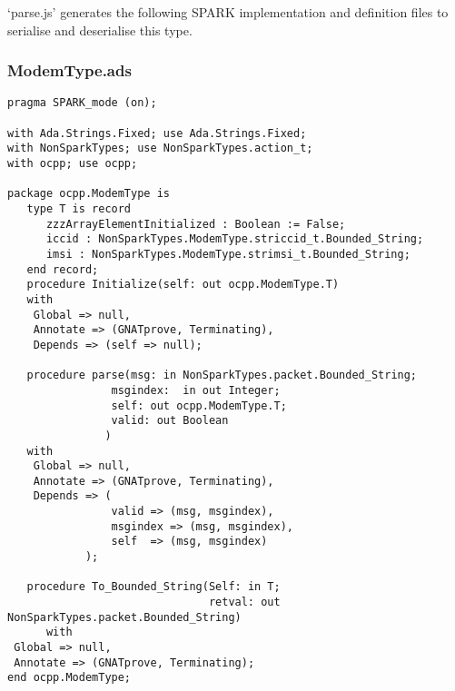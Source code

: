 \documentclass[12pt,openany,a4paper]{book}
\begin{document}
`parse.js' generates the following SPARK implementation and definition files to serialise and deserialise this type.

\subsubsection{ModemType.ads}
\begin{verbatim}
pragma SPARK_mode (on); 

with Ada.Strings.Fixed; use Ada.Strings.Fixed;
with NonSparkTypes; use NonSparkTypes.action_t; 
with ocpp; use ocpp;

package ocpp.ModemType is
   type T is record
      zzzArrayElementInitialized : Boolean := False;
      iccid : NonSparkTypes.ModemType.striccid_t.Bounded_String;
      imsi : NonSparkTypes.ModemType.strimsi_t.Bounded_String;
   end record;
   procedure Initialize(self: out ocpp.ModemType.T)
   with
    Global => null,
    Annotate => (GNATprove, Terminating),
    Depends => (self => null);

   procedure parse(msg: in NonSparkTypes.packet.Bounded_String;
                msgindex:  in out Integer;
                self: out ocpp.ModemType.T;
                valid: out Boolean
               )
   with
    Global => null,
    Annotate => (GNATprove, Terminating),
    Depends => (
                valid => (msg, msgindex),
                msgindex => (msg, msgindex),
                self  => (msg, msgindex)
            );

   procedure To_Bounded_String(Self: in T;
                               retval: out NonSparkTypes.packet.Bounded_String)
      with
 Global => null,
 Annotate => (GNATprove, Terminating);
end ocpp.ModemType;

\end{verbatim}
\end{document}
